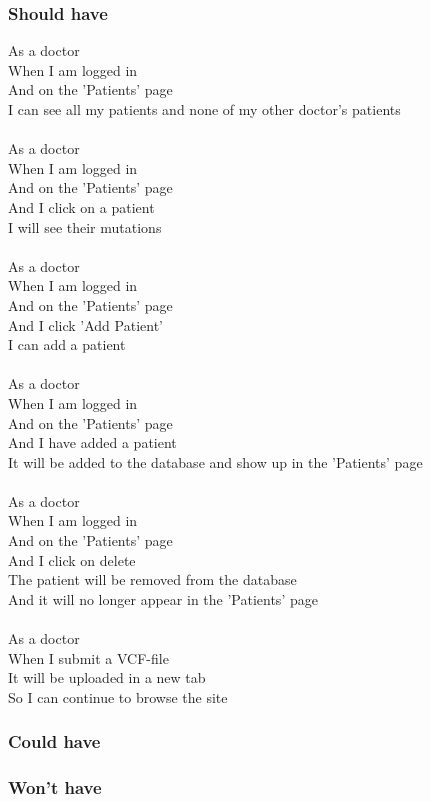 	\subsubsection*{Should have}
		As a doctor\\
		When I am logged in\\
		And on the 'Patients' page\\
		I can see all my patients and none of my other doctor's patients\\
		\\
		As a doctor\\
		When I am logged in\\
		And on the 'Patients' page\\
		And I click on a patient\\
		I will see their mutations\\
		\\
		As a doctor\\
		When I am logged in\\
		And on the 'Patients' page\\
		And I click 'Add Patient'\\
		I can add a patient\\
		\\
		As a doctor\\
		When I am logged in\\
		And on the 'Patients' page\\
		And I have added a patient\\
		It will be added to the database and show up in the 'Patients' page\\
		\\
		As a doctor\\
		When I am logged in\\
		And on the 'Patients' page\\
		And I click on delete\\
		The patient will be removed from the database\\
		And it will no longer appear in the 'Patients' page\\
		\\
		As a doctor\\
		When I submit a VCF-file\\
		It will be uploaded in a new tab\\
		So I can continue to browse the site\\
	\subsubsection*{Could have}
		
	\subsubsection*{Won't have}